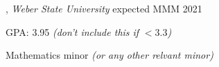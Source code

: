 
, \textit{Weber State University}	\hfill expected MMM 2021
\vspace{-2mm}
\begin{zitemize}
\item GPA:  3.95 \emph{(don't include this if} $<3.3$\emph{)}
\item Mathematics minor \emph{(or any other relvant minor)}
\end{zitemize}




